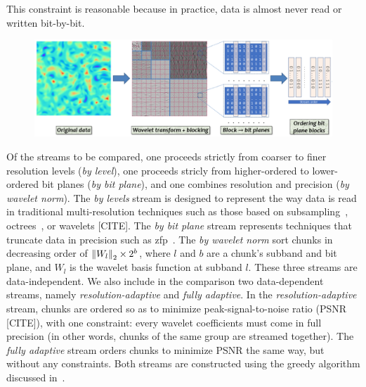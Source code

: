   This constraint is reasonable
because in practice, data is almost never read or written bit-by-bit.

\begin{figure}
        \centering
        \includegraphics[width=\linewidth]{img/pipeline.png}
        \caption{}
\end{figure}

  Of the streams to be
compared, one proceeds strictly from coarser to finer resolution
levels (\emph{by level}), one proceeds stricly from higher-ordered to
lower-ordered bit planes (\emph{by bit plane}), and one combines
resolution and precision (\emph{by wavelet norm}). The \emph{by
  levels} stream is designed to represent the way data is read in
traditional multi-resolution techniques such as those based on
subsampling~\cite{idx2001}, octrees~\cite{multires_octree1999}, or
wavelets [CITE]. The \emph{by bit plane} stream represents techniques
that truncate data in precision such as zfp~\cite{zfp2014}.  The
\emph{by wavelet norm} sort chunks in decreasing order of
$\left\lVert W_l\right\rVert_2 \times 2^b$, where $l$ and $b$ are a chunk's subband and
bit plane, and $W_l$ is the wavelet basis function at subband $l$.
These three streams are data-independent. We also include in the
comparison two data-dependent streams, namely
\emph{resolution-adaptive} and \emph{fully adaptive}. In the
\emph{resolution-adaptive} stream, chunks are ordered so as to
minimize peak-signal-to-noise ratio (PSNR [CITE]), with one
constraint: every wavelet coefficients must come in full precision (in
other words, chunks of the same group are streamed together). The
\emph{fully adaptive} stream orders chunks to minimize PSNR the same
way, but without any constraints. Both streams are constructed using
the greedy algorithm discussed in~.

